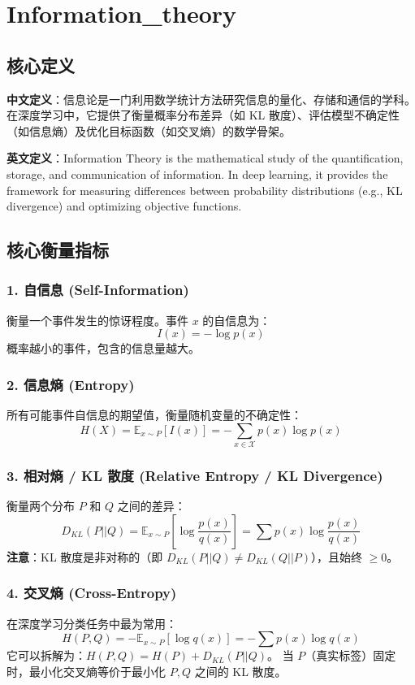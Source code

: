 \documentclass[12pt, a4paper]{book}
\begin{document}
\chapter{Information\_theory}


\section{核心定义}
\textbf{中文定义}：信息论是一门利用数学统计方法研究信息的量化、存储和通信的学科。在深度学习中，它提供了衡量概率分布差异（如 KL 散度）、评估模型不确定性（如信息熵）及优化目标函数（如交叉熵）的数学骨架。

\textbf{英文定义}：Information Theory is the mathematical study of the quantification, storage, and communication of information. In deep learning, it provides the framework for measuring differences between probability distributions (e.g., KL divergence) and optimizing objective functions.

\section{核心衡量指标}

\subsection{1. 自信息 (Self-Information)}
衡量一个事件发生的惊讶程度。事件 $x$ 的自信息为：
$$ I(x) = -\log p(x) $$
概率越小的事件，包含的信息量越大。

\subsection{2. 信息熵 (Entropy)}
所有可能事件自信息的期望值，衡量随机变量的不确定性：
$$ H(X) = \mathbb{E}_{x \sim P} [I(x)] = -\sum_{x \in \mathcal{X}} p(x) \log p(x) $$

\subsection{3. 相对熵 / KL 散度 (Relative Entropy / KL Divergence)}
衡量两个分布 $P$ 和 $Q$ 之间的差异：
$$ D_{KL}(P || Q) = \mathbb{E}_{x \sim P} \left[ \log \frac{p(x)}{q(x)} \right] = \sum p(x) \log \frac{p(x)}{q(x)} $$
\textbf{注意}：KL 散度是非对称的（即 $D_{KL}(P||Q) \neq D_{KL}(Q||P)$），且始终 $\geq 0$。

\subsection{4. 交叉熵 (Cross-Entropy)}
在深度学习分类任务中最为常用：
$$ H(P, Q) = -\mathbb{E}_{x \sim P} [\log q(x)] = -\sum p(x) \log q(x) $$
它可以拆解为：$H(P, Q) = H(P) + D_{KL}(P || Q)$。
当 $P$（真实标签）固定时，最小化交叉熵等价于最小化 $P, Q$ 之间的 KL 散度。
\end{document}
